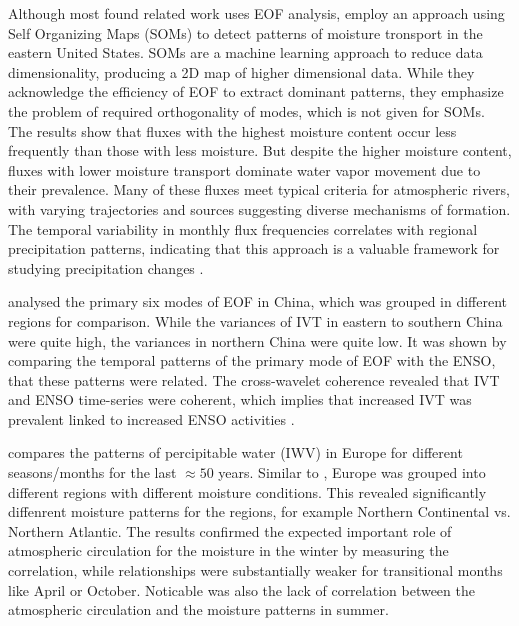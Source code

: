 Although most found related work uses EOF analysis, \citeauthor{teale_patterns_2020} employ an approach using Self Organizing Maps (SOMs) to detect patterns of moisture tronsport in the eastern United States.
SOMs are a machine learning approach to reduce data dimensionality, producing a 2D map of higher dimensional data. 
While they acknowledge the efficiency of EOF to extract dominant patterns, they emphasize the problem of required orthogonality of modes, which is not given for SOMs. 
The results show that fluxes with the highest moisture content occur less frequently than those with less moisture. 
But despite the higher moisture content, fluxes with lower moisture transport dominate water vapor movement due to their prevalence. 
Many of these fluxes meet typical criteria for atmospheric rivers, with varying trajectories and sources suggesting diverse mechanisms of formation. 
The temporal variability in monthly flux frequencies correlates with regional precipitation patterns, indicating that this approach is a valuable framework for studying precipitation changes \cite{teale_patterns_2020}.



\citeauthor{ayantobo_integrated_2022} analysed the primary six modes of EOF in China, which was grouped in different regions for comparison. 
While the variances of IVT in eastern to southern China were quite high, the variances in northern China were quite low. 
It was shown by comparing the temporal patterns of the primary mode of EOF with the ENSO, that these patterns were related. 
The cross-wavelet coherence revealed that IVT and ENSO time-series were coherent, which implies that increased IVT was prevalent linked to increased ENSO activities \cite{ayantobo_integrated_2022}. 


\citeauthor{wypych_atmospheric_2018} compares the patterns of percipitable water (IWV) in Europe for different seasons/months for the last $\approx50$ years. 
Similar to \cite{ayantobo_integrated_2022}, Europe was grouped into different regions with different moisture conditions. 
This revealed significantly diffenrent moisture patterns for the regions, for example Northern Continental vs. Northern Atlantic.
The results confirmed the expected important role of atmospheric circulation for the moisture in the winter by measuring the correlation, while relationships were substantially weaker for transitional months like April or October. 
Noticable was also the lack of correlation between the atmospheric circulation and the moisture patterns in summer. 



